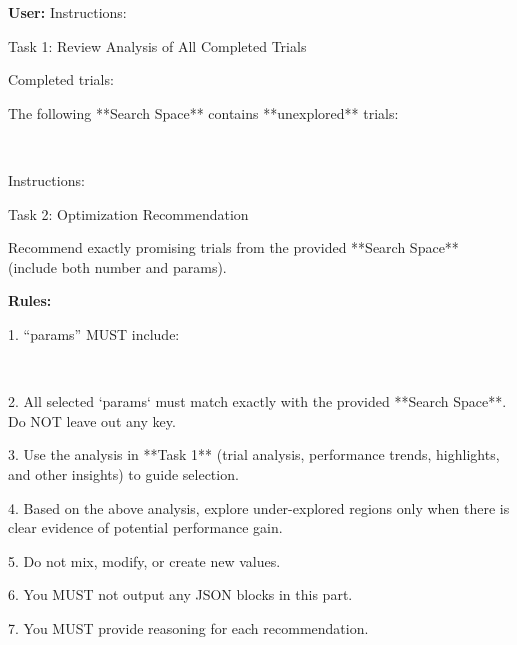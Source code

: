 \begin{tcolorbox}[breakable,colback=orange!5!white, colframe=black, title={Cognitive Prompt for Strategic Planning}]

\textbf{User:}
Instructions:

Task 1: Review Analysis of All Completed Trials

Completed trials:


The following **Search Space** contains **unexplored** trials:

\, 

Instructions:

Task 2: Optimization Recommendation

Recommend exactly  promising trials from the provided **Search Space** (include both number and params).

\textbf{Rules:}

1. ``params'' MUST include:

\,\,

2. All selected `params` must match exactly with the provided **Search Space**. Do NOT leave out any key.

3. Use the analysis in **Task 1** (trial analysis, performance trends, highlights, and other insights) to guide selection.

4. Based on the above analysis, explore under-explored regions only when there is clear evidence of potential performance gain.

5. Do not mix, modify, or create new values.

6. You MUST not output any JSON blocks in this part.

7. You MUST provide reasoning for each recommendation.
\end{tcolorbox}